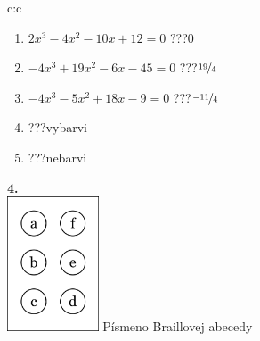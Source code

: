 \documentclass[10pt]{report}
\begin{document}
\begin{tabular}{c:c}
\begin{minipage}[c][104.5mm][t]{0.5\linewidth}
\begin{center}
\begin{minipage}{0.79\linewidth}
\begin{center}
\begin{varwidth}{\linewidth}
\begin{enumerate}
\item $2x^3-4x^2-10x+12=0$\quad \dotfill\; ???\;\dotfill \quad $0$
\item $-4x^3+19x^2-6x-45=0$\quad \dotfill\; ???\;\dotfill \quad $\nicefrac{19}{4}$
\item $-4x^3-5x^2+18x-9=0$\quad \dotfill\; ???\;\dotfill \quad $\nicefrac{-11}{4}$
\item \quad \dotfill\; ???\;\dotfill \quad vybarvi
\item \quad \dotfill\; ???\;\dotfill \quad nebarvi
\end{enumerate}
\end{varwidth}
\end{center}
\end{minipage}
\begin{minipage}{0.20\linewidth}
\begin{center}
{\Huge\bfseries 4.} \\[2mm]
\includegraphics[height=40mm]{../images/braille.png}
{\small Písmeno Braillovej abecedy}
\end{center}
\end{minipage}
\end{center}
\end{minipage}
%
\end{tabular}
\newpage
\thispagestyle{empty}
\end{document}
